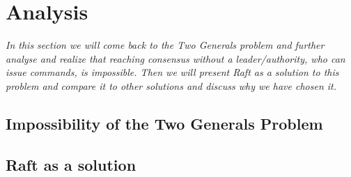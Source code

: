 \section{Analysis}

\textit{In this section we will come back to the Two Generals problem and further analyse and realize that reaching consensus without a leader/authority, who can issue commands, is impossible. Then we will present Raft as a solution to this problem and compare it to other solutions and discuss why we have chosen it.}

\subsection{Impossibility of the Two Generals Problem}

\subsection{Raft as a solution}